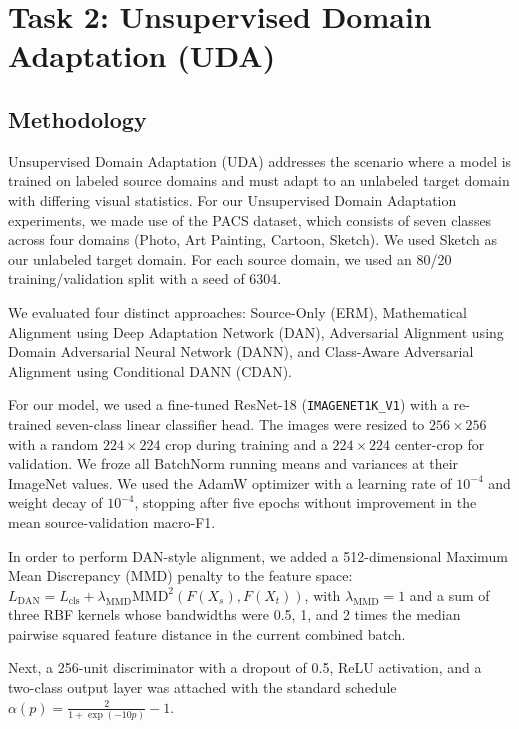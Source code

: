\documentclass{article}
\begin{document}
\newpage
\section{Task 2: Unsupervised Domain Adaptation (UDA)}
\label{sec:task2}

\subsection{Methodology}
Unsupervised Domain Adaptation (UDA) addresses the scenario where a model is trained on labeled source domains and must adapt to an unlabeled target domain with differing visual statistics. For our Unsupervised Domain Adaptation experiments, we made use of the PACS dataset, which consists of seven classes across four domains (Photo, Art Painting, Cartoon, Sketch). We used Sketch as our unlabeled target domain. For each source domain, we used an 80/20 training/validation split with a seed of 6304.

We evaluated four distinct approaches: Source-Only (ERM), Mathematical Alignment using Deep Adaptation Network (DAN), Adversarial Alignment using Domain Adversarial Neural Network (DANN), and Class-Aware Adversarial Alignment using Conditional DANN (CDAN).

For our model, we used a fine-tuned ResNet-18 (\texttt{IMAGENET1K\_V1}) with a re-trained seven-class linear classifier head. The images were resized to $256 \times 256$ with a random $224 \times 224$ crop during training and a $224 \times 224$ center-crop for validation. We froze all BatchNorm running means and variances at their ImageNet values. We used the AdamW optimizer with a learning rate of $10^{-4}$ and weight decay of $10^{-4}$, stopping after five epochs without improvement in the mean source-validation macro-F1.

In order to perform DAN-style alignment, we added a 512-dimensional Maximum Mean Discrepancy (MMD) penalty to the feature space: $L_{\text{DAN}} = L_{\text{cls}} + \lambda_{\text{MMD}} \text{MMD}^2(F(X_s), F(X_t))$, with $\lambda_{\text{MMD}}=1$ and a sum of three RBF kernels whose bandwidths were 0.5, 1, and 2 times the median pairwise squared feature distance in the current combined batch.

Next, a 256-unit discriminator with a dropout of 0.5, ReLU activation, and a two-class output layer was attached with the standard schedule $\alpha(p) = \frac{2}{1 + \exp(-10p)} - 1$.
\end{document}
